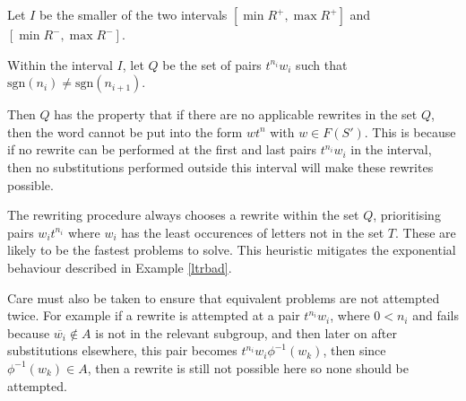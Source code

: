 \documentclass[12pt]{article} %
\theoremstyle{definition}
\theoremstyle{definition}
\theoremstyle{definition}
\newtheorem{lemma}{Lemma}[theorem]
\theoremstyle{definition}
\theoremstyle{definition}
\theoremstyle{definition}
\begin{document}
Let $I$ be the smaller of the two intervals $[\min R^+, \max R^+]$ and
$[\min R^{-}, \max R^-]$.

Within the interval $I$, let $Q$ be the set of pairs $t^{n_i}w_i$ such that
$\text{sgn}(n_i) \ne \text{sgn}(n_{i+1})$.

Then $Q$ has the property that if there are no applicable rewrites
in the set $Q$, then the word cannot be put into the form $wt^n$ with $w \in F(S')$.
This is because if no rewrite can be performed at the first and last pairs $t^{n_i}w_i$
in the interval, then no substitutions performed outside this interval will
make these rewrites possible.

The rewriting procedure always chooses a rewrite within the set $Q$, prioritising
pairs $w_it^{n_i}$ where $w_i$ has the least occurences of letters not in
the set $T$. These are likely to be the fastest problems to solve.
This heuristic mitigates the exponential behaviour described in Example \ref{ltrbad}.

Care must also be taken to ensure that equivalent problems are not attempted twice.
For example if a rewrite is attempted at a pair $t^{n_i}w_i$, where $0 < n_i$
and fails because $\overline{w_i} \notin A$ is not in the relevant subgroup,
and then later on after substitutions elsewhere, this pair becomes
$t^{n_i}w_i\phi^{-1}(w_k)$, then since $\phi^{-1}(w_k) \in A$, then a rewrite
is still not possible here so none should be attempted.








\end{document}
